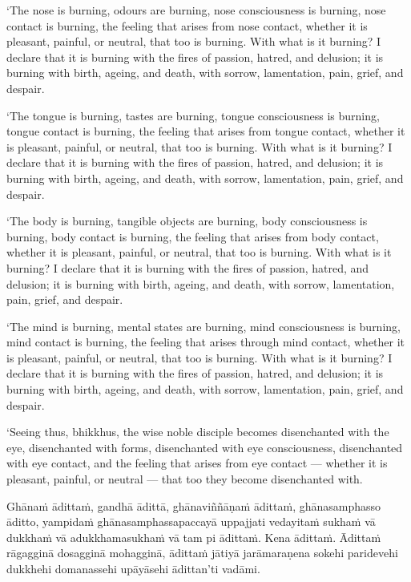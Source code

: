\clearpage

\englishText
\markboth{\englishTitle}{\rightmark}

‘The nose is burning, odours are burning, nose consciousness is burning,
nose contact is burning, the feeling that arises from nose contact,
whether it is pleasant, painful, or neutral, that too is burning. With
what is it burning? I declare that it is burning with the fires of
passion, hatred, and delusion; it is burning with birth, ageing, and
death, with sorrow, lamentation, pain, grief, and despair.

‘The tongue is burning, tastes are burning, tongue consciousness is
burning, tongue contact is burning, the feeling that arises from tongue
contact, whether it is pleasant, painful, or neutral, that too is
burning. With what is it burning? I declare that it is burning with the
fires of passion, hatred, and delusion; it is burning with birth,
ageing, and death, with sorrow, lamentation, pain, grief, and despair.

‘The body is burning, tangible objects are burning, body consciousness
is burning, body contact is burning, the feeling that arises from body
contact, whether it is pleasant, painful, or neutral, that too is
burning. With what is it burning? I declare that it is burning with the
fires of passion, hatred, and delusion; it is burning with birth,
ageing, and death, with sorrow, lamentation, pain, grief, and despair.

‘The mind is burning, mental states are burning, mind consciousness is
burning, mind contact is burning, the feeling that arises through mind
contact, whether it is pleasant, painful, or neutral, that too is
burning. With what is it burning? I declare that it is burning with the
fires of passion, hatred, and delusion; it is burning with birth,
ageing, and death, with sorrow, lamentation, pain, grief, and despair.

‘Seeing thus, bhikkhus, the wise noble disciple becomes disenchanted
with the eye, disenchanted with forms, disenchanted with eye
consciousness, disenchanted with eye contact, and the feeling that
arises from eye contact --- whether it is pleasant, painful, or
neutral --- that too they become disenchanted with.

\clearpage

\paliText
\markboth{\paliTitle}{\rightmark}

Ghānaṁ ādittaṁ, gandhā ādittā, ghānaviññāṇaṁ ādittaṁ, ghānasamphasso
āditto, yampidaṁ ghānasamphassapaccayā uppajjati vedayitaṁ sukhaṁ vā
dukkhaṁ vā adukkhamasukhaṁ vā tam pi ādittaṁ. Kena ādittaṁ. Ādittaṁ
rāgagginā dosagginā mohagginā, ādittaṁ jātiyā jarāmaraṇena sokehi
paridevehi dukkhehi domanassehi upāyāsehi ādittan'ti vadāmi.

